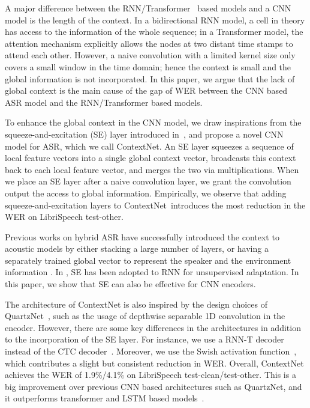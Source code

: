 \documentclass[a4paper]{article}
\newcommand{\netname}{ContextNet}
\begin{document}
A major difference between the RNN/Transformer~\cite{karita2019comparative, wang2019transformer, zhang2020transformer} based models and a CNN model is the length of the context. In a bidirectional RNN model, a cell in theory has access to the information of the whole sequence; in a Transformer model, the attention mechanism explicitly allows the nodes at two distant time stamps to attend each other. However, a naive convolution with a limited kernel size only covers a small window in the time domain; hence the context is small and the global information is not incorporated. In this paper, we argue that the lack of global context is the main cause of the gap of WER between the CNN based ASR model and the RNN/Transformer based models. 

To enhance the global context in the CNN model, we draw inspirations from the squeeze-and-excitation (SE) layer introduced in~\cite{hu2018squeeze}, and propose a novel CNN model for ASR, which  we call \netname. An SE layer squeezes a sequence of local feature vectors into a single global context vector, broadcasts this context back to each local feature vector, and merges the two via multiplications. When we place an SE layer after a naive convolution layer, we grant the convolution output the access to global information. Empirically, we observe that adding squeeze-and-excitation layers to \netname~introduces the most reduction in the WER on LibriSpeech test-other.

Previous works on hybrid ASR have successfully introduced the context to acoustic models by either stacking a large number of layers, or having a separately trained global vector to represent the speaker and the environment information \cite{peddinti2015jhu,xue2014fast,karafiat2011ivector,saon2013speaker}. In \cite{sailor2019unsupervised}, SE has been adopted to RNN for unsupervised adaptation. In this paper, we show that SE can also be effective for CNN encoders.

The architecture of \netname{} is also inspired by the design choices of QuartzNet~\cite{kriman2019quartznet}, such as the usage of depthwise separable 1D convolution in the encoder. However, there are some key differences in the architectures in addition to the incorporation of the SE layer. For instance, we use a RNN-T decoder~\cite{graves2012sequence, rao2017exploring, he2019, tara2020} instead of the CTC decoder~\cite{graves2006connectionist}. Moreover, we use the Swish activation function~\cite{ramachandran2017searching}, which contributes a slight but consistent reduction in WER. Overall, \netname{} achieves the WER of 1.9\%/4.1\% on LibriSpeech test-clean/test-other. This is a big improvement over previous CNN based architectures such as QuartzNet\cite{kriman2019quartznet}, and it outperforms transformer and LSTM based models~\cite{zhang2020transformer, wang2019transformer, zeyer2019comparison, karita2019comparative, park2019specaugment}.
\end{document}
